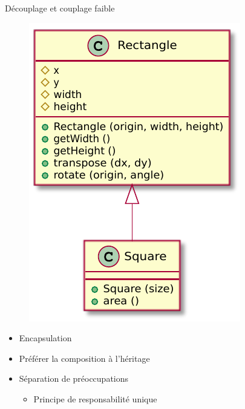 \documentclass[xcolor=table]{beamer}
\begin{document}
\begin{frame}{Découplage et couplage faible}
\begin{figure}
    \centering
    \includegraphics[scale=0.6]{fig/srp.pdf}
\end{figure}
\begin{itemize}
    \item Encapsulation
    \item Préférer la composition à l'héritage
    \item Séparation de préoccupations
    \begin{itemize}
        \item Principe de responsabilité unique
    \end{itemize}
\end{itemize}
\end{frame}
\end{document}
